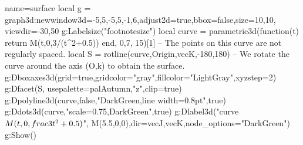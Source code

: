 \documentclass[border=5pt]{standalone}%
\begin{document}
\begin{luadraw}{name=surface}
local g = graph3d:new{window3d={-5,5,-5,5,-1,6},adjust2d=true,bbox=false,size={10,10}, viewdir={-30,50}}
g:Labelsize("footnotesize")
local curve = parametric3d(function(t) return M(t,0,3/(t^2+0.5)) end, 0,7, 15)[1] -- The points on this curve are not regularly spaced.
local S = rotline(curve,{Origin,vecK},-180,180) -- We rotate the curve around the axis (O,k) to obtain the surface.
g:Dboxaxes3d({grid=true,gridcolor="gray",fillcolor="LightGray",xyzstep=2})
g:Dfacet(S, {usepalette={palAutumn,"z"},clip=true})
g:Dpolyline3d(curve,false,"DarkGreen,line width=0.8pt",true)
g:Ddots3d(curve,"scale=0.75,DarkGreen",true)
g:Dlabel3d("curve $M(t,0,\\frac3{t^2+0.5})$", M(5.5,0,0),{dir={vecJ,vecK},node_options="DarkGreen"})
g:Show()
\end{luadraw}
\end{document}

